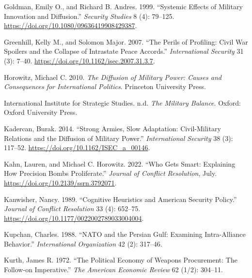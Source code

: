 \documentclass[
]{article}
\newlength{\cslhangindent}
\newlength{\cslentryspacingunit} %
\newenvironment{CSLReferences}[2] %
 {%
  \setlength{\parindent}{0pt}
  \ifodd #1
  \let\oldpar\par
  \def\par{\hangindent=\cslhangindent\oldpar}
  \fi
  \setlength{\parskip}{#2\cslentryspacingunit}
 }%
 {}
\begin{document}
\begin{CSLReferences}{1}{0}
\leavevmode{}%
Goldman, Emily O., and Richard B. Andres. 1999. {``Systemic Effects of Military Innovation and Diffusion.''} \emph{Security Studies} 8 (4): 79--125. \url{https://doi.org/10.1080/09636419908429387}.

\leavevmode{}%
Greenhill, Kelly M., and Solomon Major. 2007. {``The {Perils} of {Profiling}: {Civil War Spoilers} and the {Collapse} of {Intrastate Peace Accords}.''} \emph{International Security} 31 (3): 7--40. \url{https://doi.org/10.1162/isec.2007.31.3.7}.

\leavevmode{}%
Horowitz, Michael C. 2010. \emph{The {Diffusion} of {Military Power}: {Causes} and {Consequences} for {International Politics}}. {Princeton University Press}.

\leavevmode{}%
International Institute for Strategic Studies. n.d. \emph{The {Military Balance}}. {Oxford}: {Oxford University Press}.

\leavevmode{}%
Kadercan, Burak. 2014. {``Strong {Armies}, {Slow Adaptation}: {Civil-Military Relations} and the {Diffusion} of {Military Power}.''} \emph{International Security} 38 (3): 117--52. \url{https://doi.org/10.1162/ISEC_a_00146}.

\leavevmode{}%
Kahn, Lauren, and Michael C. Horowitz. 2022. {``Who {Gets Smart}: {Explaining How Precision Bombs Proliferate}.''} \emph{Journal of Conflict Resolution}, July. \url{https://doi.org/10.2139/ssrn.3792071}.

\leavevmode{}%
Kanwisher, Nancy. 1989. {``Cognitive {Heuristics} and {American Security Policy}.''} \emph{Journal of Conflict Resolution} 33 (4): 652--75. \url{https://doi.org/10.1177/0022002789033004004}.

\leavevmode{}%
Kupchan, Charles. 1988. {``{NATO} and the {Persian Gulf}: {Examining Intra-Alliance Behavior}.''} \emph{International Organization} 42 (2): 317--46.

\leavevmode{}%
Kurth, James R. 1972. {``The {Political Economy} of {Weapons Procurement}: {The Follow-on Imperative}.''} \emph{The American Economic Review} 62 (1/2): 304--11.


\end{CSLReferences}
\end{document}
